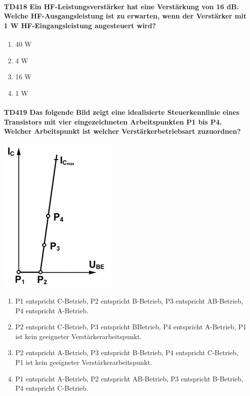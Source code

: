 \documentclass[8pt]{article}
\begin{document}
\begin{enumerate}
\begin{enumerate}[nolistsep,label=\Alph*]
\paragraph*{TD418 Ein HF-Leistungsverstärker hat eine Verstärkung von 16 dB. Welche HF-Ausgangsleistung ist zu erwarten, wenn der Verstärker mit 1 W HF-Eingangsleistung angesteuert wird?}
\begin{enumerate}[nolistsep,label=\Alph*]
\item 40 W
\item 4 W
\item 16 W
\item 1 W
\end{enumerate}

\paragraph*{TD419 Das folgende Bild zeigt eine idealisierte Steuerkennlinie eines Transistors mit vier eingezeichneten Arbeitspunkten P1 bis P4. Welcher Arbeitspunkt ist welcher Verstärkerbetriebsart zuzuordnen?}
\begin{center}
	\begin{minipage}{\linewidth}
		\centering
		\includegraphics[scale=1.0]{pics/td419_a.jpg}
	\end{minipage}
\end{center}
\begin{enumerate}[nolistsep,label=\Alph*]
\item P1 entspricht C-Betrieb, P2 entspricht B-Betrieb, P3 entspricht AB-Betrieb, P4 entspricht A-Betrieb.
\item P2 entspricht C-Betrieb, P3 entspricht BBetrieb, P4 entspricht A-Betrieb, P1 ist kein geeigneter Verstärkerarbeitspunkt.
\item P2 entspricht A-Betrieb, P3 entspricht B-Betrieb, P4 entspricht C-Betrieb, P1 ist kein geeigneter Verstärkerarbeitspunkt.
\item P1 entspricht A-Betrieb, P2 entspricht AB-Betrieb, P3 entspricht B-Betrieb, P4 entspricht C-Betrieb.
\end{enumerate}


\end{enumerate}
\end{enumerate}
\end{document}
